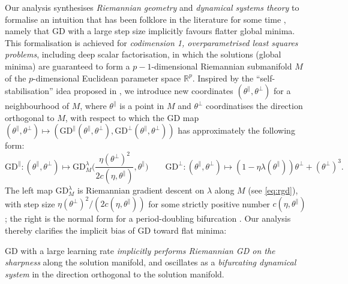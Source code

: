 \documentclass{article}
\newcommand{\RB}{\mathbb{R}}
\newcommand{\tpa}{\theta^{\parallel}}
\newcommand{\tpe}{\theta^{\perp}}
\newcommand{\GD}{\mathrm{GD}}
\theoremstyle{plain}
\theoremstyle{definition}
\theoremstyle{remark}
\begin{document}
Our analysis synthesises \emph{Riemannian geometry} and \emph{dynamical systems theory} to formalise an intuition that has been folklore in the literature for some time \cite{damianeos,chen2023eos}, namely that GD with a large step size implicitly favours flatter global minima. This formalisation is achieved for \emph{codimension 1, overparametrised least squares problems}, including deep scalar factorisation, in which the solutions (global minima) are guaranteed to form a $p-1$-dimensional Riemannian submanifold $M$ of the $p$-dimensional Euclidean parameter space $\RB^p$. Inspired by the ``self-stabilisation'' idea proposed in \cite{damianeos}, we introduce new coordinates $(\tpa,\tpe)$ for a neighbourhood of $M$, where $\tpa$ is a point in $M$ and $\tpe$ coordinatises the direction orthogonal to $M$, with respect to which the GD map $(\tpa,\tpe)\mapsto (\GD^{\parallel}(\tpa,\tpe),\GD^{\perp}(\tpa,\tpe))$ has approximately the following form:
\begin{equation}\label{eq:initialequation}
    \GD^{\parallel}:(\tpa,\tpe)\mapsto \GD_M^{\lambda}\bigg(\frac{\eta(\tpe)^2}{2c(\eta,\tpa)},\tpa\bigg)\qquad \GD^{\perp}:(\tpa,\tpe)\mapsto (1   -\eta\lambda(\tpa))\tpe+(\tpe)^3.
\end{equation}
The left map $\GD_M^{\lambda}$ is Riemannian gradient descent on $\lambda$ along $M$ (see \eqref{eq:rgd}), with step size $\eta(\tpe)^2/(2c(\eta,\tpa))$ for some strictly positive number $c(\eta,\tpa)$; the right is the normal form for a period-doubling bifurcation \cite{kuznetsov}. Our analysis thereby clarifies the implicit bias of GD toward flat minima: 

\begin{tcolorbox}
\centering
GD with a large learning rate \emph{implicitly performs Riemannian GD on the sharpness} along the solution manifold, and oscillates as a \emph{bifurcating dynamical system} in the direction orthogonal to the solution manifold.
\end{tcolorbox}
\end{document}
